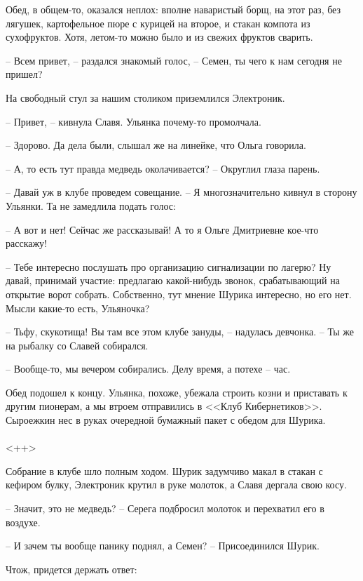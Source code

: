 \documentclass[a4paper]{book}
\begin{document}
Обед, в общем-то, оказался неплох: вполне наваристый борщ, на этот раз, без лягушек, картофельное пюре с курицей на второе, и стакан компота из сухофруктов. Хотя, летом-то можно было и из свежих фруктов сварить.

-- Всем привет, -- раздался знакомый голос, -- Семен, ты чего к нам сегодня не пришел? 

На свободный стул за нашим столиком приземлился Электроник. 

-- Привет, -- кивнула Славя. Ульянка почему-то промолчала.

-- Здорово. Да дела были, слышал же на линейке, что Ольга говорила.

-- А, то есть тут правда медведь околачивается? -- Округлил глаза парень.

-- Давай уж в клубе проведем совещание. -- Я многозначительно кивнул в сторону Ульянки. Та не замедлила подать голос:

-- А вот и нет! Сейчас же рассказывай! А то я Ольге Дмитриевне кое-что расскажу!

-- Тебе интересно послушать про организацию сигнализации по лагерю? Ну давай, принимай участие: предлагаю какой-нибудь звонок, срабатывающий на открытие ворот собрать. Собственно, тут мнение Шурика интересно, но его нет. Мысли какие-то есть, Ульяночка?

-- Тьфу, скукотища! Вы там все этом клубе зануды, -- надулась девчонка. -- Ты же на рыбалку со Славей собирался. 

-- Вообще-то, мы вечером собирались. Делу время, а потехе -- час. 

Обед подошел к концу. Ульянка, похоже, убежала строить козни и приставать к другим пионерам, а мы втроем отправились в <<Клуб Кибернетиков>>. Сыроежкин нес в руках очередной бумажный пакет с обедом для Шурика.

\paragraph{}<++>


Собрание в клубе шло полным ходом. Шурик задумчиво макал в стакан с кефиром булку, Электроник крутил в руке молоток, а Славя дергала свою косу.

-- Значит, это не медведь? -- Серега подбросил молоток и перехватил его в воздухе.  

-- И зачем ты вообще панику поднял, а Семен? -- Присоединился Шурик.

Чтож, придется держать ответ:
\end{document}
